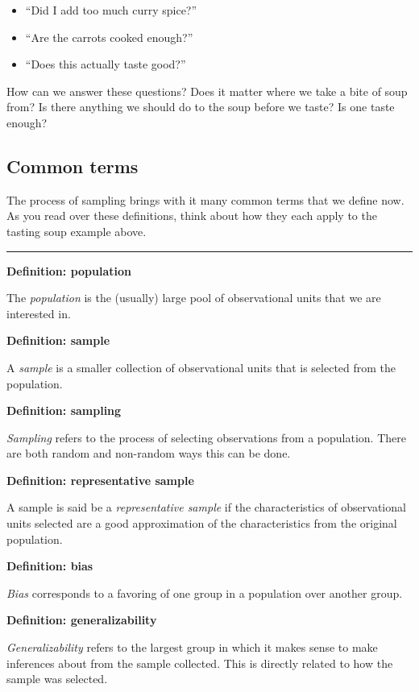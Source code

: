 \documentclass[]{tufte-book}
\let\oldrule=\rule
\renewcommand{\rule}[1]{\oldrule{\linewidth}}
\providecommand{\tightlist}{%
  \setlength{\itemsep}{0pt}\setlength{\parskip}{0pt}}
\theoremstyle{definition}
\theoremstyle{definition}
\theoremstyle{remark}
\begin{document}
\begin{itemize}
\tightlist
\item
  ``Did I add too much curry spice?''
\item
  ``Are the carrots cooked enough?''\\
\item
  ``Does this actually taste good?''
\end{itemize}

How can we answer these questions? Does it matter where we take a bite
of soup from? Is there anything we should do to the soup before we
taste? Is one taste enough?

\subsection{Common terms}\label{common-terms}

The process of sampling brings with it many common terms that we define
now. As you read over these definitions, think about how they each apply
to the tasting soup example above.

\begin{center}\rule{0.5\linewidth}{\linethickness}\end{center}

\textbf{Definition: population}

The \emph{population} is the (usually) large pool of observational units
that we are interested in.

\textbf{Definition: sample}

A \emph{sample} is a smaller collection of observational units that is
selected from the population.

\textbf{Definition: sampling}

\emph{Sampling} refers to the process of selecting observations from a
population. There are both random and non-random ways this can be done.

\textbf{Definition: representative sample}

A sample is said be a \emph{representative sample} if the
characteristics of observational units selected are a good approximation
of the characteristics from the original population.

\textbf{Definition: bias}

\emph{Bias} corresponds to a favoring of one group in a population over
another group.

\textbf{Definition: generalizability}

\emph{Generalizability} refers to the largest group in which it makes
sense to make inferences about from the sample collected. This is
directly related to how the sample was selected.
\end{document}
